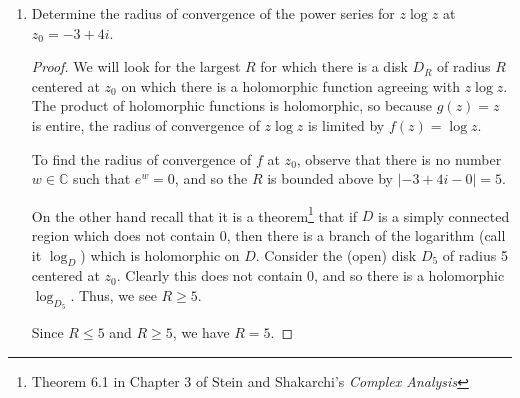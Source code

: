 \documentclass{article}
\begin{document}
\begin{enumerate}
\begin{proof}
		The coefficient of $z^{0}$ is 
		\begin{align*}
			-\frac{1}{2} \left ( \frac{1}{4} + \frac{1}{8} + \frac{1}{16} +\cdots \right ) 
			&= -\frac{1}{2} \left(2 - 1 - \frac{1}{2}\right) = -1/4 \\
		\end{align*} 
		
		The coefficient of $z^1$ is
		\begin{align*}
			-\frac{1}{2} \left ( \frac{1}{8} + \frac{1}{16} + \frac{1}{32} + \cdots \right ) &= - \frac{1}{2} \left ( 2 - 1 - \frac{1}{2} - \frac{1}{4} \right )\\
			&= - \frac{1}{8}.
		\end{align*}
		 
		Therefore \[ f(z) = \cdots - \frac{1}{2z} - \frac{1}{4} - \frac{z}{8} + \cdots \]
	\end{proof}
	
Note that there is also a Laurent series which converges for the annulus $0 < |z| < 1$. This can be found by using the geometric series expansion \[\frac{1}{z-1} = \frac{-1}{1-z} = - \sum_{n=0}^\infty z^n\] which of course converges for $|z|< 1$, and using the same expansion of $\frac{1}{z-2}$ as above. This is the one provided by SageMath. For another example of this, see \href{https://math.stackexchange.com/questions/2553132/laurent-series-for-different-domains}{this math StackExchange post}.

\setcounter{enumi}{4}
	\item Determine the radius of convergence of the power series for $z \log z$ at $z_0 = -3 + 4i$.
	
	\begin{proof}
		We will look for the largest $R$ for which there is a disk $D_R$ of radius $R$ centered at $z_0$ on which there is a holomorphic function agreeing with $z \log z$.
		The product of holomorphic functions is holomorphic, so because $g(z) = z$ is entire, the radius of convergence of $z \log z$ is limited by $f(z) = \log z$. 
		
		To find the radius of convergence of $f$ at $z_0$, observe that there is no number $w \in \mathbb{C}$ such that $e^w = 0$, and so the $R$ is bounded above by $|-3 + 4i - 0| = 5$.		
		
		On the other hand recall that it is a theorem\footnote{Theorem 6.1 in Chapter 3 of Stein and Shakarchi's \textit{Complex Analysis}} that if $D$ is a simply connected region which does not contain $0$, then there is a branch of the logarithm (call it $\log_D$) which is holomorphic on $D$. Consider the (open) disk $D_5$ of radius 5 centered at $z_0$. Clearly this does not contain $0$, and so there is a holomorphic $\log_{D_5}$. Thus, we see $R \geq 5$. 
		
		Since $R \leq 5$ and $R \geq 5$, we have $R = 5$.
	\end{proof}

\end{enumerate}
\end{document}
